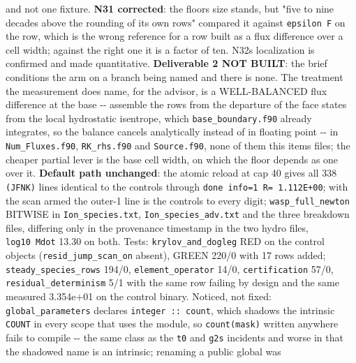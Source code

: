 \documentclass[english,a4paper]{my_memo}
\begin{document}
\begin{itemize}
  and not one fixture. \textbf{N31 corrected}: the floor\textquotesingle s size stands, but
  "five to nine decades above the rounding of its own rows" compared it
  against \texttt{epsilon\ \textbar{}\textbar{}F\textbar{}\textbar{}} on the row, which is the wrong reference for a
  row built as a flux difference over a cell width; against the right
  one it is a factor of ten. N32\textquotesingle s localization is confirmed and made
  quantitative. \textbf{Deliverable 2 NOT BUILT}: the brief conditions the
  arm on a branch being named and there is none. The treatment the
  measurement does name, for the advisor, is a WELL-BALANCED flux
  difference at the base -\/- assemble the rows from the departure of the
  face states from the local hydrostatic isentrope, which
  \texttt{base\_boundary.f90} already integrates, so the balance cancels
  analytically instead of in floating point -\/- in \texttt{Num\_Fluxes.f90},
  \texttt{RK\_rhs.f90} and \texttt{Source.f90}, none of them this item\textquotesingle s files; the
  cheaper partial lever is the base cell width, on which the floor
  depends as one over it. \textbf{Default path unchanged}: the atomic reload
  at cap 40 gives all 338 \texttt{(JFNK)} lines identical to the control\textquotesingle s
  through \texttt{done\ info=1\ \textbar{}\textbar{}R\textbar{}\textbar{}=\ 1.112E+00}; with the scan armed the
  outer-1 line is the control\textquotesingle s to every digit; \texttt{wasp\_full\_newton}
  BITWISE in \texttt{Ion\_species.txt}, \texttt{Ion\_species\_adv.txt} and the three
  breakdown files, differing only in the provenance timestamp in the two
  hydro files, \texttt{log10\ Mdot} 13.30 on both. Tests: \texttt{krylov\_and\_dogleg}
  RED on the control objects (\texttt{resid\_jump\_scan\_on} absent), GREEN 220/0
  with 17 rows added; \texttt{steady\_species\_rows} 194/0, \texttt{element\_operator}
  14/0, \texttt{certification} 57/0, \texttt{residual\_determinism} 5/1 with the same
  row failing by design and the same measured 3.354e+01 on the control
  binary. Noticed, not fixed: \texttt{global\_parameters} declares
  \texttt{integer\ ::\ count}, which shadows the intrinsic \texttt{COUNT} in every scope
  that uses the module, so \texttt{count(mask)} written anywhere fails to
  compile -\/- the same class as the \texttt{t0} and \texttt{g2s} incidents and worse in
  that the shadowed name is an intrinsic; renaming a public global was

\end{itemize}
\end{document}
